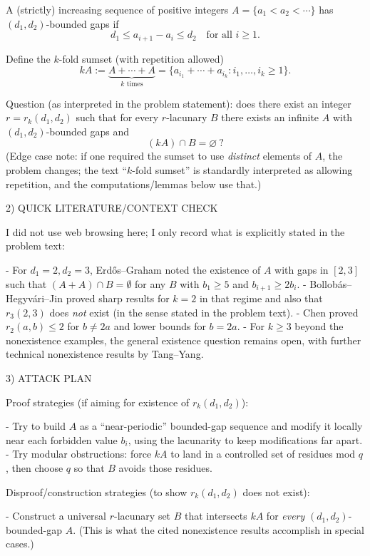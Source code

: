 A (strictly) increasing sequence of positive integers \(A=\{a_1<a_2<\cdots\}\) has \((d_1,d_2)\)-bounded gaps if
\[
 d_1\le a_{i+1}-a_i\le d_2\quad\text{for all }i\ge 1.
\]

Define the \(k\)-fold sumset (with repetition allowed)
\[
 kA := \underbrace{A+\cdots +A}_{k\text{ times}}=\{a_{i_1}+\cdots+a_{i_k}: i_1,\dots,i_k\ge 1\}.
\]

Question (as interpreted in the problem statement): does there exist an integer \(r=r_k(d_1,d_2)\) such that for every \(r\)-lacunary \(B\) there exists an infinite \(A\) with \((d_1,d_2)\)-bounded gaps and
\[
 (kA)\cap B = \varnothing\ ?
\]
(Edge case note: if one required the sumset to use \emph{distinct} elements of \(A\), the problem changes; the text ``\(k\)-fold sumset'' is standardly interpreted as allowing repetition, and the computations/lemmas below use that.)

2) QUICK LITERATURE/CONTEXT CHECK

I did not use web browsing here; I only record what is explicitly stated in the problem text:

- For \(d_1=2,d_2=3\), Erd\H{o}s--Graham noted the existence of \(A\) with gaps in \([2,3]\) such that \((A+A)\cap B=\emptyset\) for any \(B\) with \(b_{1}\ge 5\) and \(b_{i+1}\ge 2b_i\).
- Bollob\'as--Hegyv\'ari--Jin proved sharp results for \(k=2\) in that regime and also that \(r_3(2,3)\) does \emph{not} exist (in the sense stated in the problem text).
- Chen proved \(r_2(a,b)\le 2\) for \(b\ne 2a\) and lower bounds for \(b=2a\).
- For \(k\ge 3\) beyond the nonexistence examples, the general existence question remains open, with further technical nonexistence results by Tang--Yang.

3) ATTACK PLAN

Proof strategies (if aiming for existence of \(r_k(d_1,d_2)\)):

- Try to build \(A\) as a ``near-periodic'' bounded-gap sequence and modify it locally near each forbidden value \(b_i\), using the lacunarity to keep modifications far apart.
- Try modular obstructions: force \(kA\) to land in a controlled set of residues mod \(q\), then choose \(q\) so that \(B\) avoids those residues.

Disproof/construction strategies (to show \(r_k(d_1,d_2)\) does not exist):

- Construct a universal \(r\)-lacunary set \(B\) that intersects \(kA\) for \emph{every} \((d_1,d_2)\)-bounded-gap \(A\). (This is what the cited nonexistence results accomplish in special cases.)

